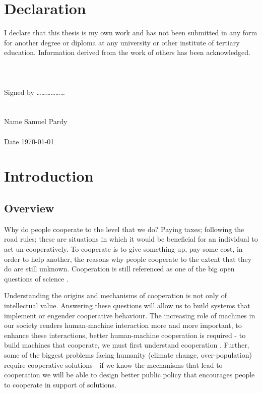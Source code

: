 \documentclass[11pt]{book}
\newcommand*{\np}{\par\noindent\newline}
\begin{document}
\chapter*{Declaration}
\np I declare that this thesis is my own work and has not been submitted in any form for another degree or diploma at any university or other institute of tertiary education. Information derived from the work of others has been acknowledged.\\\\\\\\



\noindent Signed by ………………\\\\\\




\noindent Name \quad	Samuel Pardy\\\\
\noindent Date \quad \today


\tableofcontents
\newpage
\listoffigures
\chapter{Introduction}
\section{Overview}\label{overview}
Why do people cooperate to the level that we do? Paying taxes; following the road rules; these are situations in which it would be beneficial for an individual to act un-cooperatively.
To cooperate is to give something up, pay some cost, in order to help another, the reasons why people cooperate to the extent that they do are still unknown. 
Cooperation is still referenced as one of the big open questions of science \citep{pennisi_how_2005}.

\np Understanding the origins and mechanisms of cooperation is not only of intellectual value.
Answering these questions will allow us to build systems that implement or engender cooperative behaviour. 
The increasing role of machines in our society renders human-machine interaction more and more important, to enhance these interactions, better human-machine cooperation is required -
 to build machines that cooperate, we must first understand cooperation \citep{hoc_human_2000}.
Further, some of the biggest problems facing humanity (climate change, over-population) require cooperative solutions - 
if we know the mechanisms that lead to cooperation we will be able to design better public policy that encourages people to cooperate in support of solutions.
\end{document}
